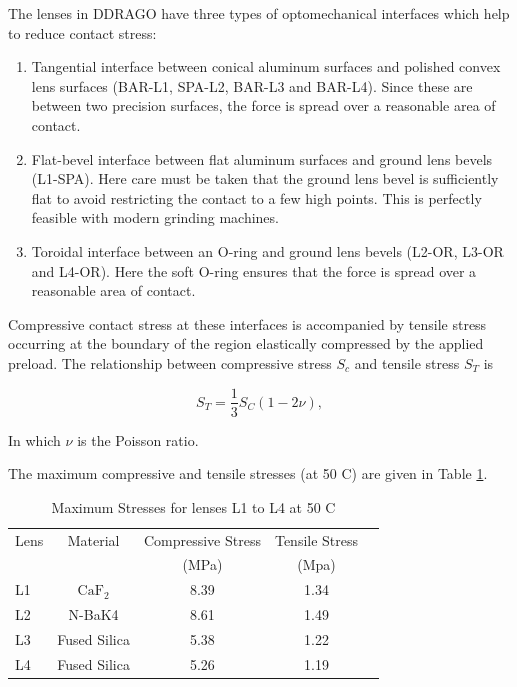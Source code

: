 \documentclass{report}
\newcommand{\CaF}{\ensuremath{\mathrm{CaF_2}}}
\begin{document}
The lenses in DDRAGO have three types of optomechanical interfaces which help to reduce contact stress:
\begin{enumerate}
\item Tangential interface between conical aluminum surfaces and polished convex lens surfaces (BAR-L1, SPA-L2, BAR-L3 and BAR-L4). Since these are between two precision surfaces, the force is spread over a reasonable area of contact.
\item Flat-bevel interface between flat aluminum surfaces and ground lens bevels (L1-SPA). Here care must be taken that the ground lens bevel is sufficiently flat to avoid restricting the contact to a few high points. This is perfectly feasible with modern grinding machines.
\item Toroidal interface between an O-ring and ground lens bevels (L2-OR, L3-OR and L4-OR). Here the soft O-ring ensures that the force is spread over a reasonable area of contact.
\end{enumerate}

Compressive contact stress at these interfaces is accompanied by tensile stress occurring at the boundary of the region elastically compressed by the applied preload. The relationship between compressive stress $S_c$ and tensile stress $S_T$ is

\begin{equation}
\label{Eq:stress}
S_T = \frac{1}{3}S_C(1-2\nu),
\end{equation}

In which $\nu$ is the Poisson ratio.

The maximum compressive and tensile stresses (at 50 C) are given in Table \ref{table:stress}.

\begin{table}
\caption{Maximum Stresses for lenses L1 to L4 at 50 C}
\label{table:stress}
\begin{center}
\small
\begin{tabular}{lcccc}
\hline
\hline
Lens&Material&Compressive Stress&Tensile Stress\\
&&(MPa)&(Mpa)\\
\hline
L1 &{\CaF}&8.39&1.34\\
L2 &N-BaK4&8.61&1.49\\
L3 &Fused Silica&5.38&1.22\\
L4 &Fused Silica&5.26&1.19\\
\hline
\end{tabular}
\end{center}
\end{table}
\end{document}
